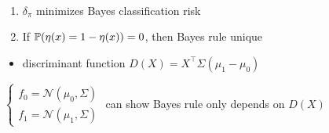 \begin{prop}\,
    \begin{enumerate}
        \item $\delta_\pi$ minimizes Bayes classification risk
        \item If $\mathbb{P}(\eta(x) = 1 - \eta(x)) = 0$, then Bayes rule unique
    \end{enumerate}
\end{prop}

\begin{itemize}
    \item discriminant function $D(X) = X^\top\Sigma(\mu_1 - \mu_0)$
\end{itemize}

\begin{example}
    $\begin{cases}
         f_0 = \mathcal{N}(\mu_0, \Sigma)\\
         f_1 = \mathcal{N}(\mu_1, \Sigma)
    \end{cases}$
    can show Bayes rule only depends on $D(X)$
\end{example}

